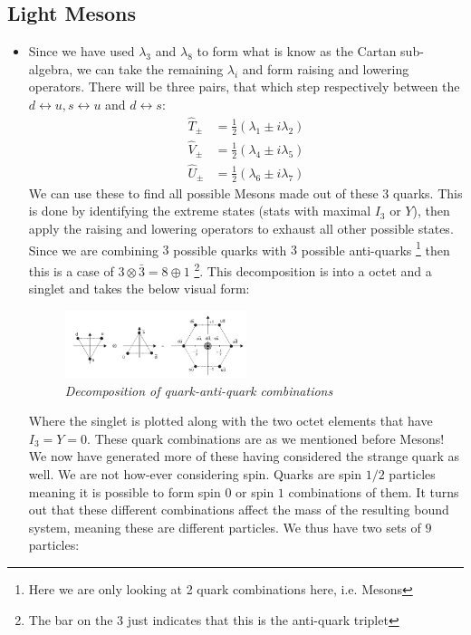 \documentclass[11pt]{article}
\numberwithin{equation}{section}
\begin{document}
\subsection{Light Mesons} %
\label{sub:light_mesons}
\begin{itemize}
\item Since we have used $\lambda_3$ and $\lambda_8$ to form what is know as the Cartan sub-algebra, we can take the remaining $\lambda_i$ and form raising and lowering operators. There will be three pairs, that which step respectively between the $d \leftrightarrow u, s\leftrightarrow u$ and $d\leftrightarrow s$:
\begin{align}
    \hat{T}_\pm &= \frac{1}{2} (\lambda_1 \pm i \lambda_2) \\
    \hat{V}_\pm &= \frac{1}{2} (\lambda_4 \pm i \lambda_5) \\
    \hat{U}_\pm &= \frac{1}{2} (\lambda_6 \pm i \lambda_7)
\end{align}
We can use these to find all possible Mesons made out of these $3$ quarks. This is done by identifying the extreme states (stats with maximal $I_3$ or $Y$), then apply the raising and lowering operators to exhaust all other possible states. Since we are combining $3$ possible quarks with $3$ possible anti-quarks \footnote{Here we are only looking at 2 quark combinations here, i.e. Mesons} then this is a case of $3 \otimes \bar{3} = 8 \oplus 1$ \footnote{The bar on the $3$ just indicates that this is the anti-quark triplet}. This decomposition is into a octet and a singlet and takes the below visual form:
 \begin{figure}[H]
\centering
\includegraphics[width=0.5\textwidth]{3x3}
\caption{\label{trailer}\emph{Decomposition of quark-anti-quark combinations }}
\end{figure} 
Where the singlet is plotted along with the two octet elements that have $I_3 = Y = 0$. These quark combinations are as we mentioned before Mesons! We now have generated more of these having considered the strange quark as well. We are not how-ever considering spin. Quarks are spin $1/2$ particles meaning it is possible to form spin $0$ or spin $1$ combinations of them. It turns out that these different combinations affect the mass of the resulting bound system, meaning these are different particles. We thus have two sets of $9$ particles:

\end{itemize}
\end{document}
